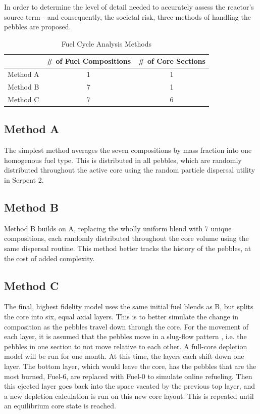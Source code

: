 \documentclass{anstrans}
\begin{document}
In order to determine the level of detail needed to accurately assess the reactor's source term - and consequently, the societal risk, three methods of handling the pebbles are proposed.

\begin{table}[H]
  \centering
  \caption{Fuel Cycle Analysis Methods}
  	\begin{tabular}{ccc}\toprule
 		& \# of Fuel Compositions & \# of Core Sections \\ \midrule
 		Method A & 1 & 1 \\
 		Method B & 7 & 1 \\
 		Method C & 7 & 6 \\
	\bottomrule
	\end{tabular}
  \label{tab:fuelcycles}
\end{table}

\subsection{Method A}
The simplest method averages the seven compositions by mass fraction into one homogenous fuel type.  This is distributed in all pebbles, which are randomly distributed throughout the active core using the random particle dispersal utility in Serpent 2.
\subsection{Method B}
Method B builds on A, replacing the wholly uniform blend with 7 unique compositions, each randomly distributed throughout the core volume using the same dispersal routine.  This method better tracks the history of the pebbles, at the cost of added complexity.
\subsection{Method C}
The final, highest fidelity model uses the same initial fuel blends as B, but splits the core into six, equal axial layers.  This is to better simulate the change in composition as the pebbles travel down through the core.
For the movement of each layer, it is assumed that the pebbles move in a slug-flow pattern \cite{cisneros_pebble_2013}, i.e. the pebbles in one section to not move relative to each other.  A full-core depletion model will be run for one month.  At this time, the layers each shift down one layer.  The bottom layer, which would leave the core, has the pebbles that are the most burned, Fuel-6, are replaced with Fuel-0 to simulate online refueling.  Then this ejected layer goes back into the space vacated by the previous top layer, and a new depletion calculation is run on this new core layout.  This is repeated until an equilibrium core state is reached.
\end{document}
